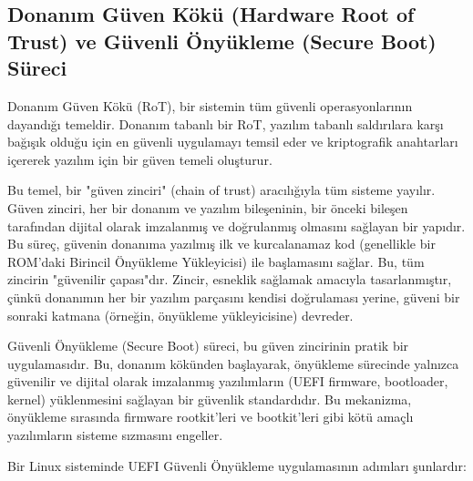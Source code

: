 \subsection{Donanım Güven Kökü (Hardware Root of Trust) ve Güvenli Önyükleme (Secure Boot) Süreci}

Donanım Güven Kökü (RoT), bir sistemin tüm güvenli operasyonlarının dayandığı temeldir. Donanım tabanlı bir RoT, yazılım tabanlı saldırılara karşı bağışık olduğu için en güvenli uygulamayı temsil eder ve kriptografik anahtarları içererek yazılım için bir güven temeli oluşturur.


Bu temel, bir "güven zinciri" (chain of trust) aracılığıyla tüm sisteme yayılır. Güven zinciri, her bir donanım ve yazılım bileşeninin, bir önceki bileşen tarafından dijital olarak imzalanmış ve doğrulanmış olmasını sağlayan bir yapıdır. Bu süreç, güvenin donanıma yazılmış ilk ve kurcalanamaz kod (genellikle bir ROM'daki Birincil Önyükleme Yükleyicisi) ile başlamasını sağlar. Bu, tüm zincirin "güvenilir çapası"dır. Zincir, esneklik sağlamak amacıyla tasarlanmıştır, çünkü donanımın her bir yazılım parçasını kendisi doğrulaması yerine, güveni bir sonraki katmana (örneğin, önyükleme yükleyicisine) devreder.

Güvenli Önyükleme (Secure Boot) süreci, bu güven zincirinin pratik bir uygulamasıdır. Bu, donanım kökünden başlayarak, önyükleme sürecinde yalnızca güvenilir ve dijital olarak imzalanmış yazılımların (UEFI firmware, bootloader, kernel) yüklenmesini sağlayan bir güvenlik standardıdır. Bu mekanizma, önyükleme sırasında firmware rootkit'leri ve bootkit'leri gibi kötü amaçlı yazılımların sisteme sızmasını engeller.

Bir Linux sisteminde UEFI Güvenli Önyükleme uygulamasının adımları şunlardır:

